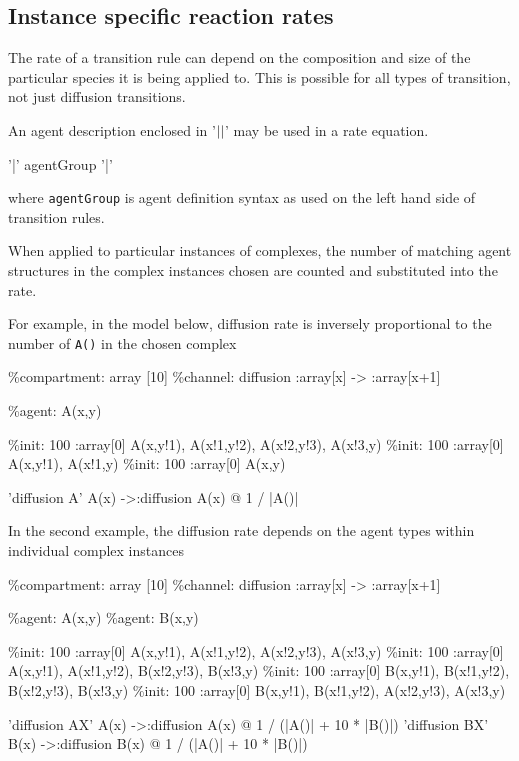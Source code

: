 \subsection{Instance specific reaction rates}

The rate of a transition rule can depend on the composition and size of the particular species it is being applied to. This is possible for all types of transition, not just diffusion transitions.  

An agent description enclosed in '$\arrowvert\arrowvert$' may be used in a rate equation.

\begin{bnfsource}
'|' agentGroup '|'
\end{bnfsource}

where \verb|agentGroup| is agent definition syntax as used on the left hand side of transition rules.

When applied to particular instances of complexes, the number of matching agent structures in the complex instances chosen are counted and substituted into the rate.

For example, in the model below, diffusion rate is inversely proportional to the number of \verb|A()| in the chosen complex

\begin{kappasource}
\%compartment: array [10]
\%channel: diffusion :array[x] -> :array[x+1]

\%agent: A(x,y)

\%init: 100 :array[0] A(x,y!1), A(x!1,y!2), A(x!2,y!3), A(x!3,y)
\%init: 100 :array[0] A(x,y!1), A(x!1,y)
\%init: 100 :array[0] A(x,y)

'diffusion A' A(x) ->:diffusion A(x) @ 1 / |A()|
\end{kappasource}

In the second example, the diffusion rate depends on the agent types within individual complex instances

\begin{kappasource}
\%compartment: array [10]
\%channel: diffusion :array[x] -> :array[x+1]

\%agent: A(x,y)
\%agent: B(x,y)

\%init: 100 :array[0] A(x,y!1), A(x!1,y!2), A(x!2,y!3), A(x!3,y)
\%init: 100 :array[0] A(x,y!1), A(x!1,y!2), B(x!2,y!3), B(x!3,y)
\%init: 100 :array[0] B(x,y!1), B(x!1,y!2), B(x!2,y!3), B(x!3,y)
\%init: 100 :array[0] B(x,y!1), B(x!1,y!2), A(x!2,y!3), A(x!3,y)

'diffusion AX' A(x) ->:diffusion A(x) @ 1 / (|A()| + 10 * |B()|)
'diffusion BX' B(x) ->:diffusion B(x) @ 1 / (|A()| + 10 * |B()|)
\end{kappasource}

